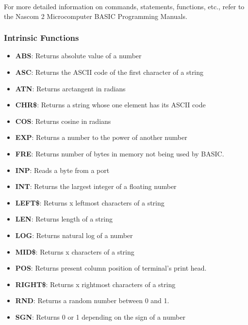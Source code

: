    For more detailed information on commands, statements, functions, etc.,
    refer to the Nascom 2 Microcomputer BASIC Programming Manuals\cite{nascombasic}.

        \subsubsection{Intrinsic Functions}

        \begin{itemize}
            \item \textbf{ABS}: Returns absolute value of a number
            \item \textbf{ASC}: Returns the ASCII code of the first character of a string
            \item \textbf{ATN}: Returns arctangent in radians
            \item \textbf{CHR\$}: Returns a string whose one element has its ASCII code
            \item \textbf{COS}: Returns cosine in radians
            \item \textbf{EXP}: Returns a number to the power of another number
            \item \textbf{FRE}: Returns number of bytes in memory not being used by BASIC.
            \item \textbf{INP}: Reads a byte from a port
            \item \textbf{INT}: Returns the largest integer of a floating number
            \item \textbf{LEFT\$}: Returns x leftmost characters of a string
            \item \textbf{LEN}: Returns length of a string
            \item \textbf{LOG}: Returns natural log of a number
            \item \textbf{MID\$}: Returns x characters of a string
            \item \textbf{POS}: Returns present column position of terminal's print head.
            \item \textbf{RIGHT\$}: Returns x rightmost characters of a string
            \item \textbf{RND}: Returns a random number between 0 and 1.
            \item \textbf{SGN}: Returns 0 or 1 depending on the sign of a number

\end{itemize}
